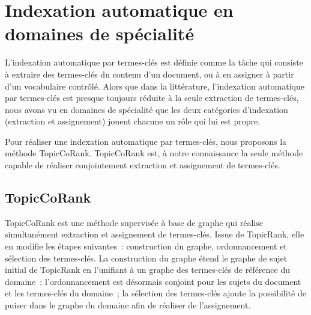 
  \section{Indexation automatique en domaines de spécialité}
  \label{sec:main-domain_specific_keyphrase_annotation-supervised_automatic_keyphrase_extraction}
    L'indexation automatique par termes-clés est définie comme la tâche qui
    consiste à extraire des termes-clés du contenu d'un document, ou à en
    assigner à partir d'un vocabulaire contrôlé. Alors que dans la
    littérature, l'indexation automatique par termes-clés est presque toujours réduite à la
    seule extraction de termes-clés, nous avons vu en domaines de spécialité
    que les deux catégories d'indexation (extraction et assignement) jouent
    chacune un rôle qui lui est propre.

    Pour réaliser une indexation automatique par termes-clés, nous proposons la
    méthode TopicCoRank. TopicCoRank est, à notre connaissance la seule méthode
    capable de réaliser conjointement extraction et assignement de termes-clés.

    \subsection{TopicCoRank}
    \label{subsec:main-domain_specific_keyphrase_annotation-supervised_automatic_keyphrase_annotation-topiccorank}
      TopicCoRank est une méthode supervisée à base de graphe qui réalise
      simultanément extraction et assignement de termes-clés. Issue de
      TopicRank, elle en modifie les étapes suivantes~: construction du graphe,
      ordonnancement et sélection des termes-clés. La construction du graphe
      étend le graphe de sujet initial de TopicRank en l'unifiant à un graphe
      des termes-clés de référence du domaine~; l'ordonnancement est désormais
      conjoint pour les sujets du document et les termes-clés du domaine~; la
      sélection des termes-clés ajoute la possibilité de puiser dans le graphe
      du domaine afin de réaliser de l'assignement.

